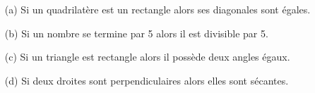 \documentclass[12pt,a4paper]{article}
\begin{document}
\begin{enumerate}
\item[(a)] Si un quadrilatère est un rectangle alors ses diagonales sont égales.
\item[(b)] Si un nombre se termine par 5 alors il est divisible par 5.
\item[(c)] Si un triangle est rectangle alors il possède deux angles égaux.
\item[(d)] Si deux droites sont perpendiculaires alors elles sont sécantes.
\end{enumerate}
\end{document}
